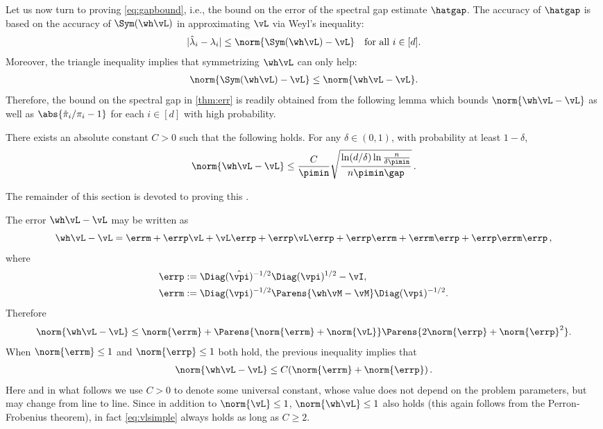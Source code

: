 
Let us now turn to proving \eqref{eq:gapbound}, i.e., 
the bound on the error of the spectral gap estimate $\hatgap$.
The accuracy of $\hatgap$ is based on the accuracy of $\Sym(\wh\vL)$
in approximating $\vL$ via Weyl's inequality:
\begin{align*}%
  |\hat\lambda_i - \lambda_i|
  \leq \norm{\Sym(\wh\vL) - \vL}
  \quad \text{for all }i \in [d] .
\end{align*}
Moreover, the triangle inequality implies that symmetrizing $\wh\vL$
can only help:
\begin{align*}
  \norm{\Sym(\wh\vL) - \vL} \leq \norm{\wh\vL - \vL} .
\end{align*}
Therefore, the bound on the spectral gap in \cref{thm:err} is readily obtained from the
following lemma which bounds $\norm{\wh\vL - \vL}$ as well as $\abs{
\hat\pi_i/\pi_i - 1 }$ for each $i \in [d]$ with high probability.
\begin{lemma}
  \label{lem:err}
  There exists an absolute constant $C>0$ such that the following
  holds.
  For any $\delta \in (0,1)$, with probability at least $1-\delta$,
  \begin{equation*}
    \norm{\wh\vL - \vL}
    \leq
    \frac{C}{\pimin}
      \sqrt{\frac{\ln(d/\delta)\ln\frac{n}{\delta\pimin}}{n\pimin\gap}} \,.
  \end{equation*}
\end{lemma}
The remainder of this section is devoted to proving this .

The error $\wh\vL - \vL$ may be written as
\[
  \wh\vL - \vL
  = \errm + \errp \vL + \vL \errp + \errp \vL \errp
  + \errp \errm + \errm \errp + \errp \errm \errp\,,
\]
where
\begin{align*}
  \errp & := \Diag(\hat\vpi)^{-1/2} \Diag(\vpi)^{1/2} - \vI , \\
  \errm & := \Diag(\vpi)^{-1/2} \Parens{
    \wh\vM - \vM
  } \Diag(\vpi)^{-1/2} .
\end{align*}
Therefore
\begin{align*}%
  \norm{\wh\vL - \vL}
  \leq \norm{\errm} +
  \Parens{
    \norm{\errm} + \norm{\vL}
  }
  \Parens{
    2\norm{\errp} + \norm{\errp}^2
  }
  .
\end{align*}
When  $\norm{\errm}\le 1$ and $\norm{\errp}\le 1$ both hold, the previous inequality implies that
\begin{align}\label{eq:vlsimple}
\norm{\wh\vL - \vL} \le C(\norm{\errm}+\norm{\errp})\,.
\end{align}
Here and in what follows we use $C>0$ to denote some universal constant, whose value does not depend on the problem parameters, but may change from line to line.
Since in addition to $\norm{\vL}\le 1$,  $\norm{\wh\vL}\le 1$ also holds (this again follows from the Perron-Frobenius theorem), in fact  \eqref{eq:vlsimple}  always holds as long as $C\ge 2$.

